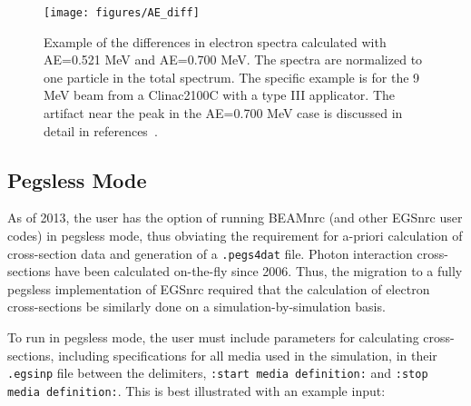\documentclass[12pt,twoside]{article}
\begin{document}
\vspace{5mm}
\begin{figure}[htbp]
\begin{center}
\leavevmode
\mbox{}\hspace{0cm}
\texttt{[image: figures/AE\_diff]}
\caption[Example of effects of AE=0.521 vs 0.700 on electron beam energy
spectrum.] {Example of the differences in electron spectra calculated
with AE=0.521 MeV and AE=0.700 MeV. The spectra are normalized to one
particle in the total spectrum. The specific example is for the 9
MeV beam from a Clinac2100C with a type III applicator.  The artifact
near the peak in the AE=0.700 MeV case is discussed in detail in
references~\cite{Ro84,RB90}.}
\label{fig_AE_diff}
\end{center}
\end{figure}

\subsection{Pegsless Mode}
\label{pegsless_sect}
As of 2013, the user has the option of running BEAMnrc (and other EGSnrc user codes) in pegsless
mode, thus obviating the requirement for a-priori calculation of cross-section data and generation
of a {\tt .pegs4dat} file.  Photon interaction cross-sections have been calculated on-the-fly since
2006.  Thus, the migration to a fully pegsless implementation of EGSnrc required that
the calculation of electron cross-sections be similarly done on a simulation-by-simulation
basis.

To run in pegsless mode, the user must include parameters for calculating cross-sections, including
specifications for all media used in the simulation, in their {\tt .egsinp} file between the
delimiters, {\tt :start media definition:} and {\tt :stop media definition:}.  This is best illustrated
with an example input:
\end{document}
